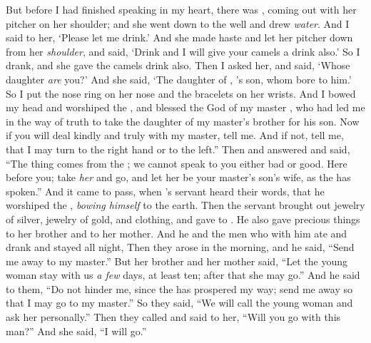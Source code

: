 \bverse But before I had finished speaking in my heart, there was \Rebekah, coming out with her pitcher on her shoulder; and she went down to the well and drew \textit{water}. And I said to her, `Please let me drink.' 
\bverse And she made haste and let her pitcher down from her \textit{shoulder}, and said, `Drink and I will give your camels a drink also.' So I drank, and she gave the camels drink also.
\bverse Then I asked her, and said, `Whose daughter \textit{are} you?' And she said, `The daughter of , 's son, whom  bore to him.' So I put the nose ring on her nose and the bracelets on her wrists.
\bverse And I bowed my head and worshiped the \lord, and blessed the \lord God of my master \Abraham, who had led me in the way of truth to take the daughter of my master's brother for his son.
\bverse Now if you will deal kindly and truly with my master, tell me. And if not, tell me, that I may turn to the right hand or to the left.''
\bverse Then \Laban and  answered and said, ``The thing comes from the \lord; we cannot speak to you either bad or good.
\bverse Here \is \Rebekah before you; take \textit{her} and go, and let her be your master's son's wife, as the \lord has spoken.''
\bverse And it came to pass, when \Abraham's servant heard their words, that he worshiped the \lord, \textit{bowing himself} to the earth.
\bverse Then the servant brought out jewelry of silver, jewelry of gold, and clothing, and gave \them to \Rebekah. He also gave precious things to her brother and to her mother.
\bverse And he and the men who \were with him ate and drank and stayed all night, Then they arose in the morning, and he said, ``Send me away to my master.''
\bverse But her brother and her mother said, ``Let the young woman stay with us \textit{a few} days, at least ten; after that she may go.''
\bverse And he said to them, ``Do not hinder me, since the \lord has prospered my way; send me away so that I may go to my master.''
\bverse So they said, ``We will call the young woman and ask her personally.''
\bverse Then they called \Rebekah and said to her, ``Will you go with this man?'' And she said, ``I will go.''

